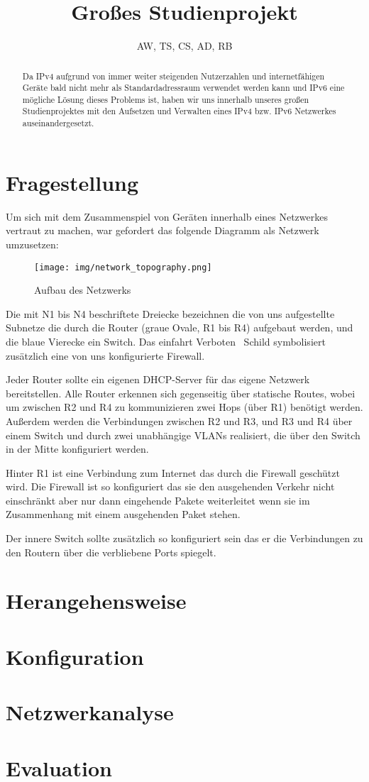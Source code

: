 \documentclass[10pt,a4paper]{article}
\author{AW, TS, CS, AD, RB}
\title{Großes Studienprojekt}
\begin{document}
	\maketitle
	\begin{abstract}
		Da IPv4 aufgrund von immer weiter steigenden Nutzerzahlen und internetfähigen Geräte bald nicht mehr als Standardadressraum verwendet werden kann und IPv6 eine mögliche Lösung dieses Problems ist, haben wir uns innerhalb unseres großen Studienprojektes  mit den Aufsetzen und Verwalten eines IPv4 bzw. IPv6 Netzwerkes auseinandergesetzt. 
	\end{abstract}
	\section{Fragestellung}
	Um sich mit dem Zusammenspiel von Geräten innerhalb eines Netzwerkes vertraut zu machen, war gefordert das folgende Diagramm als Netzwerk umzusetzen:
	\begin{figure}[ht]
		\texttt{[image: img/network\_topography.png]}
		\centering
		\caption{Aufbau des Netzwerks}
	\end{figure}
\par
	Die mit N1 bis N4 beschriftete Dreiecke bezeichnen die von uns aufgestellte Subnetze die durch die Router (graue Ovale, R1 bis R4) aufgebaut werden, und die blaue Vierecke ein Switch. Das \glqq einfahrt Verboten\grqq~ Schild symbolisiert zusätzlich eine von uns konfigurierte Firewall.
\par
	Jeder Router sollte ein eigenen DHCP-Server für das eigene Netzwerk bereitstellen. Alle Router erkennen sich gegenseitig über statische Routes, wobei um zwischen R2 und R4 zu kommunizieren zwei Hops (über R1) benötigt werden. Außerdem werden die Verbindungen zwischen R2 und R3, und R3 und R4 über einem Switch und durch zwei unabhängige VLANs realisiert, die über den Switch in der Mitte konfiguriert werden.
\par
	Hinter R1 ist eine Verbindung zum Internet das durch die Firewall geschützt wird. Die Firewall ist so konfiguriert das sie den ausgehenden Verkehr nicht einschränkt aber nur dann eingehende Pakete weiterleitet wenn sie im Zusammenhang mit einem ausgehenden Paket stehen.
\par
	Der innere Switch sollte zusätzlich so konfiguriert sein das er die Verbindungen zu den Routern über die verbliebene Ports spiegelt.
	
	\section{Herangehensweise}
	\section{Konfiguration}
	\section{Netzwerkanalyse}
	\section{Evaluation}
\end{document}

